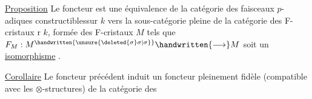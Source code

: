 \uline{Proposition} Le foncteur  est une équivalence de la catégorie des faisceaux $p$-adiques constructiblessur $k$ vers la sous-catégorie pleine de la catégorie des F-cristaux r $k$, formée des F-cristaux $M$ tels que $F_M : M^{\handwritten{\unsure{\deleted{\sigma}\sigma|\sigma}}}\handwritten{\longrightarrow}M$ soit un \uline{isomorphisme} .

\uline{Corollaire} Le foncteur précédent induit un foncteur pleinement fidèle (compatible avec les $\otimes$-structures) de la catégorie des


